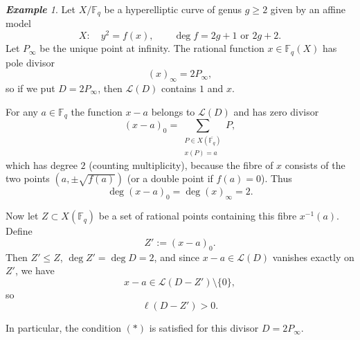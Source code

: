 \documentclass[14pt]{amsart}
\theoremstyle{plain}
\theoremstyle{definition}
\theoremstyle{remark}
\newtheorem{exam}[thm]{\bf Example}
\theoremstyle{example}
\def \F{\mathbb{F}}
\begin{document}
\begin{exam}
Let $X/\F_q$ be a hyperelliptic curve of genus $g\ge 2$ given by an affine
model
$$
X:\quad y^2 = f(x), \qquad \deg f = 2g+1 \text{ or } 2g+2.
$$
Let $P_\infty$ be the unique point at infinity. The rational function $x\in\F_q(X)$
has pole divisor
$$
(x)_\infty = 2P_\infty,
$$
so if we put $D=2P_\infty$, then $\mathcal L(D)$ contains $1$ and $x$.

For any $a\in\F_q$ the function $x-a$ belongs to $\mathcal L(D)$ and has zero
divisor
$$
(x-a)_0 = \sum_{\substack{P\in X(\overline{\F_q})\\ x(P)=a}} P,
$$
which has degree $2$ (counting multiplicity), because the fibre of $x$
consists of the two points $(a,\pm\sqrt{f(a)})$ (or a double point if
$f(a)=0$). Thus
$$
\deg (x-a)_0 = \deg (x)_\infty = 2.
$$

Now let $Z\subset X(\F_q)$ be a set of rational points containing this fibre
$x^{-1}(a)$. Define
$$
Z' := (x-a)_0.
$$
Then $Z'\le Z$, $\deg Z'=\deg D=2$, and since $x-a\in \mathcal L(D)$ vanishes
exactly on $Z'$, we have
$$
x-a \in \mathcal L(D-Z')\setminus\{0\},
$$
so
$$
\ell(D-Z') > 0.
$$

In particular, the condition $(*)$ is satisfied for this divisor $D=2P_\infty$.
\end{exam}
\end{document}

